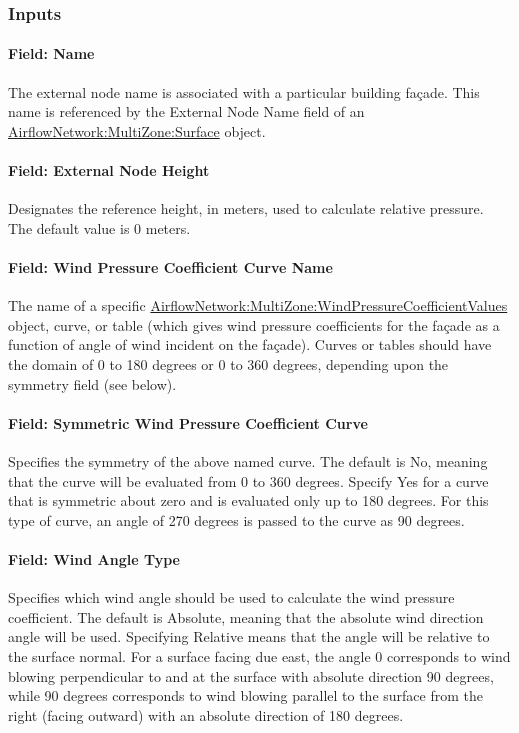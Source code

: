 \subsubsection{Inputs}\label{inputs-8-001}

\paragraph{Field: Name}\label{field-name-8-001}

The external node name is associated with a particular building fa\c{c}ade.
This name is referenced by the External Node Name field of an \hyperref[airflownetworkmultizonesurface]{AirflowNetwork:MultiZone:Surface} object.

\paragraph{Field: External Node Height}\label{field-external-node-height}

Designates the reference height, in meters, used to calculate relative pressure. The default value is 0 meters.

\paragraph{Field: Wind Pressure Coefficient Curve Name}\label{field-wind-pressure-coefficient-values-object-name}

The name of a specific \hyperref[airflownetworkmultizonewindpressurecoefficientvalues]{AirflowNetwork:MultiZone:WindPressureCoefficientValues}
object, curve, or table (which gives wind pressure coefficients for the
fa\c{c}ade as a function of angle of wind incident on the fa\c{c}ade). Curves
or tables should have the domain of 0 to 180 degrees or 0 to 360 degrees,
depending upon the symmetry field (see below).

\paragraph{Field: Symmetric Wind Pressure Coefficient Curve}\label{field-symmetric-wind-pressure-coefficient}
Specifies the symmetry of the above named curve. The default is No, meaning
that the curve will be evaluated from 0 to 360 degrees. Specify Yes for a
curve that is symmetric about zero and is evaluated only up to 180 degrees.
For this type of curve, an angle of 270 degrees is passed to the curve as
90 degrees.

\paragraph{Field: Wind Angle Type}\label{field-wind-angle-type}
Specifies which wind angle should be used to calculate the wind pressure
coefficient. The default is Absolute, meaning that the absolute wind direction
angle will be used. Specifying Relative means that the angle will be relative
to the surface normal. For a surface facing due east, the angle 0 corresponds
to wind blowing perpendicular to and at the surface with absolute direction
90 degrees, while 90 degrees corresponds to wind blowing parallel to the
surface from the right (facing outward) with an absolute direction of 180 degrees.

